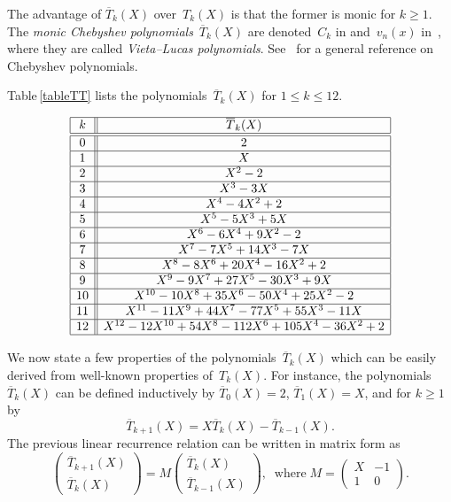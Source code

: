 \documentclass[11pt, a4paper]{amsart}
\theoremstyle{definition}
\newcommand\TT{\overline{T}}
\numberwithin{equation}{section}
\begin{document}
The advantage of $\TT_k (X)$ over~$T_k(X)$ is that the former is monic for $k\geq 1$.
The \emph{monic Chebyshev polynomials}~$\TT_k (X)$ are denoted~$C_k$ in \cite{AS} 
and~$v_n(x)$ in~\cite{Ho}, where they are called \emph{Vieta--Lucas polynomials}.
See~\cite{Ri} for a general reference on Chebyshev polynomials.

Table\,\ref{tableTT} lists the polynomials~$\TT_k (X)$ for $1 \leq k \leq 12$.

\begin{table}[ht]
\caption{\emph{The monic Chebyshev polynomials $\TT_k (X)$}}\label{tableTT}
\renewcommand\arraystretch{1.25}
\noindent\[
\begin{array}{|c||c|}
\hline
k & \TT_k(X)  \\
\hline\hline
0 & 2  \\ 
\hline
1 & X  \\ 
\hline
2 & X^2 - 2   \\
\hline
3 & X^3 - 3X   \\ 
\hline
4 & X^4 - 4X^2 +2  \\ 
\hline
5 & X^5 - 5X^3 + 5X  \\ 
\hline
6 &  X^6 - 6X^4 + 9 X^2 - 2 \\
\hline
7 & X^7 - 7 X^5 + 14 X^3 - 7X  \\ 
\hline
8 & X^8 - 8 X^6 + 20 X^4 -16 X^2 +2 \\ 
\hline
9 &  X^9 - 9 X^7 + 27 X^5 - 30 X^3 + 9 X   \\
\hline
10 &  X^{10} - 10 X^8 + 35 X^6 - 50 X^4 + 25 X^2 - 2  \\
\hline
11 &  X^{11} - 11 X^9 + 44 X^7 - 77 X^5 + 55 X^3 - 11X   \\
\hline
12 &   X^{12} - 12 X^{10} + 54 X^8 - 112 X^6 + 105 X^4 - 36 X^2 +2  \\
\hline
\end{array}
\]
\end{table}

We now state a few properties of the polynomials~$\TT_k (X)$ which can be easily derived from well-known properties
of~$T_k (X)$. 
For instance, the polynomials~$\TT_k (X)$ can be defined inductively by
$\TT_0 (X) = 2$, $\TT_1 (X) = X$, and for $k\geq 1$ by
\begin{equation}\label{rec-TT}
\TT_{k+1}(X) = X\TT_k(X) - \TT_{k-1}(X) .
\end{equation}
The previous linear recurrence relation can be written in matrix form as
\begin{equation}\label{matrix-TT}
\begin{pmatrix}
\TT_{k+1}(X) \\ \TT_k(X)
\end{pmatrix}
=  M
\begin{pmatrix}
\TT_k(X) \\ \TT_{k-1}(X)
\end{pmatrix}, \;\; \text{where} \; M = 
\begin{pmatrix}
X & - 1\\
 1 & 0
\end{pmatrix} .
\end{equation}
\end{document}
